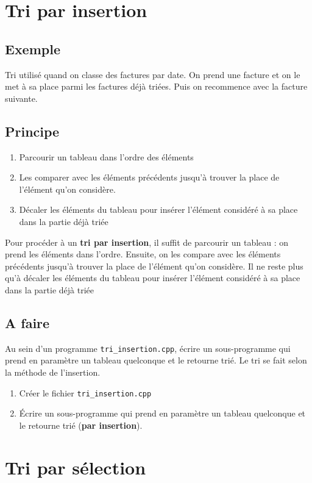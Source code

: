 \documentclass[french]{article}
\begin{document}
\section{Tri par insertion}

\subsection*{Exemple}
Tri utilisé quand on classe des factures par date. On prend une facture et on le met à sa place parmi les factures déjà triées. Puis on recommence avec la facture suivante. 

\subsection*{Principe}
\begin{enumerate}
	\item Parcourir un tableau dans l'ordre des éléments
	\item Les comparer avec les éléments précédents jusqu'à trouver la place de l'élément qu'on considère.
	\item Décaler les éléments du tableau pour insérer l'élément considéré à sa place dans la partie déjà triée
\end{enumerate} 
Pour procéder à un \textbf{tri par insertion}, il suffit de parcourir un tableau : on prend les éléments dans l'ordre. Ensuite, on les compare avec les éléments précédents jusqu'à trouver la place de l'élément qu'on considère. Il ne reste plus qu'à décaler les éléments du tableau pour insérer l'élément considéré à sa place dans la partie déjà triée

\subsection*{A faire}
 Au sein d’un programme \texttt{tri\_insertion.cpp}, écrire un sous-programme qui prend en paramètre un tableau quelconque et le retourne trié. Le tri se fait selon la méthode de l’insertion. 
\begin{enumerate}
	\item Créer le fichier \texttt{tri\_insertion.cpp}
	\item Écrire un sous-programme qui prend en paramètre un tableau quelconque et le retourne trié (\textbf{par insertion}).
\end{enumerate}

\section{Tri par sélection}
\end{document}
